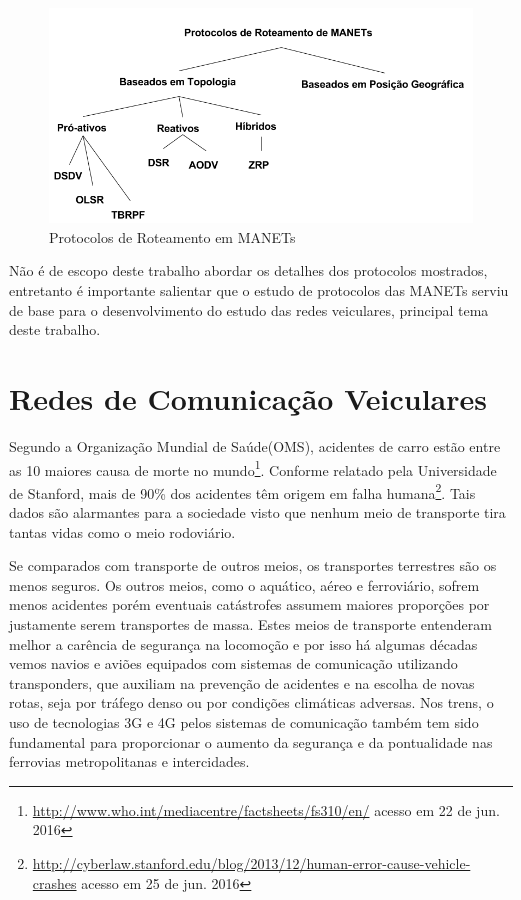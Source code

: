 \documentclass[
12pt,				%
openright,			%
oneside,			%
a4paper,			%
brazil,				%
]{abntex2}
\begin{document}
	\begin{figure} [H]
		\centering
		\includegraphics[scale=.5]{figuras/cap2/12ProtocolosDeRoteamentoMANETs}
		\caption{\label{fig_12}Protocolos de Roteamento em MANETs}
	\end{figure}	
	
	\par Não é de escopo deste trabalho abordar os detalhes dos protocolos mostrados, entretanto é importante salientar que o estudo de protocolos das MANETs serviu de base para o desenvolvimento do estudo das redes veiculares, principal tema deste trabalho. 
	

	
	\newpage
	\chapter{Redes de Comunicação Veiculares}

	\par Segundo a Organização Mundial de Saúde(OMS), acidentes de carro estão entre as 10 maiores causa de morte no mundo{\footnote{\href{http://www.who.int/mediacentre/factsheets/fs310/en/}{http://www.who.int/mediacentre/factsheets/fs310/en/} acesso em 22 de jun. 2016}}. Conforme relatado pela Universidade de Stanford, mais de 90\% dos acidentes têm origem em falha humana{\footnote{\href{http://cyberlaw.stanford.edu/blog/2013/12/human-error-cause-vehicle-crashes}{http://cyberlaw.stanford.edu/blog/2013/12/human-error-cause-vehicle-crashes} acesso em 25 de jun. 2016}}. Tais dados são alarmantes para a sociedade visto que nenhum meio de transporte tira tantas vidas como o meio rodoviário.

	\par Se comparados com transporte de outros meios, os transportes terrestres são os menos seguros. Os outros meios, como o aquático, aéreo e ferroviário, sofrem menos acidentes porém eventuais catástrofes assumem maiores proporções por justamente serem transportes de massa. Estes meios de transporte entenderam melhor a carência de segurança na locomoção e por isso há algumas décadas vemos navios e aviões equipados com sistemas de comunicação utilizando transponders, que auxiliam na prevenção de acidentes e na escolha de novas rotas, seja por tráfego denso ou por condições climáticas adversas. Nos trens, o uso de tecnologias 3G e 4G pelos sistemas de comunicação também tem sido fundamental para proporcionar o aumento da segurança e da pontualidade nas ferrovias metropolitanas e intercidades.
	
\end{document}
